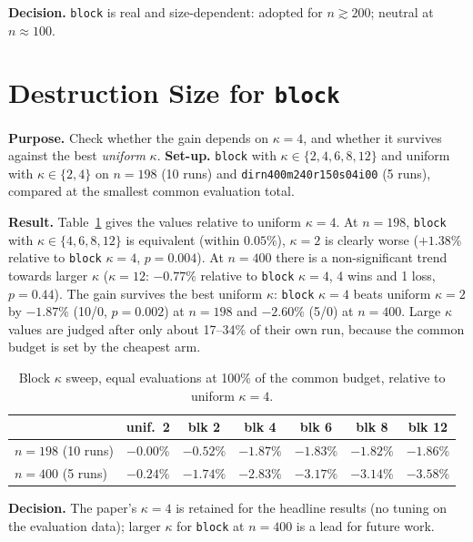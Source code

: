 \textbf{Decision.} \texttt{block} is real and size-dependent: adopted for $n\gtrsim200$; neutral at $n\approx100$.


\section{Destruction Size for \texttt{block}}\label{sec:exp-bk}

\textbf{Purpose.} Check whether the gain depends on $\kappa=4$, and whether it survives against the best \emph{uniform} $\kappa$. \textbf{Set-up.} \texttt{block} with $\kappa\in\{2,4,6,8,12\}$ and uniform with $\kappa\in\{2,4\}$ on $n=198$ (10 runs) and \texttt{dirn400m240r150s04i00} (5 runs), compared at the smallest common evaluation total.

\textbf{Result.} Table~\ref{tab:bk} gives the values relative to uniform $\kappa=4$. At $n=198$, \texttt{block} with $\kappa\in\{4,6,8,12\}$ is equivalent (within $0.05\%$), $\kappa=2$ is clearly worse ($+1.38\%$ relative to \texttt{block} $\kappa=4$, $p=0.004$). At $n=400$ there is a non-significant trend towards larger $\kappa$ ($\kappa=12$: $-0.77\%$ relative to \texttt{block} $\kappa=4$, 4 wins and 1 loss, $p=0.44$). The gain survives the best uniform $\kappa$: \texttt{block} $\kappa=4$ beats uniform $\kappa=2$ by $-1.87\%$ (10/0, $p=0.002$) at $n=198$ and $-2.60\%$ (5/0) at $n=400$. Large $\kappa$ values are judged after only about 17--34\% of their own run, because the common budget is set by the cheapest arm.

\begin{table}[htbp]
\centering
\caption{Block $\kappa$ sweep, equal evaluations at 100\% of the common budget, relative to uniform $\kappa=4$.}
\label{tab:bk}
\small
\begin{tabular}{lcccccc}
\toprule
 & \textbf{unif.\ 2} & \textbf{blk 2} & \textbf{blk 4} & \textbf{blk 6} & \textbf{blk 8} & \textbf{blk 12}\\
\midrule
$n=198$ (10 runs) & $-0.00\%$ & $-0.52\%$ & $-1.87\%$ & $-1.83\%$ & $-1.82\%$ & $-1.86\%$\\
$n=400$ (5 runs) & $-0.24\%$ & $-1.74\%$ & $-2.83\%$ & $-3.17\%$ & $-3.14\%$ & $-3.58\%$\\
\bottomrule
\end{tabular}
\end{table}

\textbf{Decision.} The paper's $\kappa=4$ is retained for the headline results (no tuning on the evaluation data); larger $\kappa$ for \texttt{block} at $n=400$ is a lead for future work.

